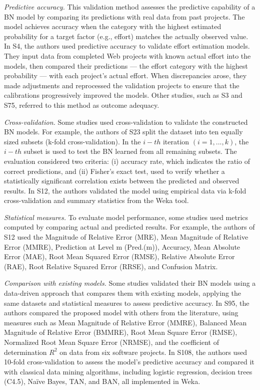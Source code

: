 \textit{Predictive accuracy.} This validation method assesses the predictive capability of a BN model by comparing its predictions with real data from past projects. The model achieves accuracy when the category with the highest estimated probability for a target factor (e.g., effort) matches the actually observed value. In S4, the authors used predictive accuracy to validate effort estimation models. They input data from completed Web projects with known actual effort into the models, then compared their predictions --- the effort category with the highest probability --- with each project's actual effort. When discrepancies arose, they made adjustments and reprocessed the validation projects to ensure that the calibrations progressively improved the models. Other studies, such as S3 and S75, referred to this method as outcome adequacy.

\textit{Cross-validation.} Some studies used cross-validation to validate the constructed BN models. For example, the authors of S23 split the dataset into ten equally sized subsets (k-fold cross-validation). In the $i-th$ iteration $(i = 1, ..., k)$, the $i-th$ subset is used to test the BN learned from all remaining subsets. The evaluation considered two criteria: (i) accuracy rate, which indicates the ratio of correct predictions, and (ii) Fisher's exact test, used to verify whether a statistically significant correlation exists between the predicted and observed results. In S12, the authors validated the model using empirical data via k-fold cross-validation and summary statistics from the Weka tool.

\textit{Statistical measures.} To evaluate model performance, some studies used metrics computed by comparing actual and predicted results. For example, the authors of S12 used the Magnitude of Relative Error (MRE), Mean Magnitude of Relative Error (MMRE), Prediction at Level m (Pred.(m)), Accuracy, Mean Absolute Error (MAE), Root Mean Squared Error (RMSE), Relative Absolute Error (RAE), Root Relative Squared Error (RRSE), and Confusion Matrix.

\textit{Comparison with existing models.} Some studies validated their BN models using a data-driven approach that compares them with existing models, applying the same datasets and statistical measures to assess predictive accuracy. In S95, the authors compared the proposed model with others from the literature, using measures such as Mean Magnitude of Relative Error (MMRE), Balanced Mean Magnitude of Relative Error (BMMRE), Root Mean Square Error (RMSE), Normalized Root Mean Square Error (NRMSE), and the coefficient of determination $R^2$ on data from six software projects. In S108, the authors used 10-fold cross-validation to assess the model's predictive accuracy and compared it with classical data mining algorithms, including logistic regression, decision trees (C4.5), Naïve Bayes, TAN, and BAN, all implemented in Weka.

